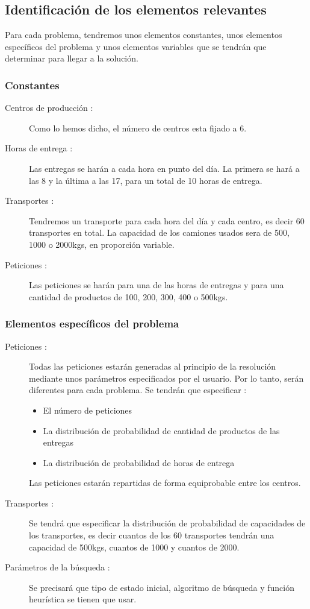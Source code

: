 \documentclass{article}
\begin{document}
\subsection{Identificación de los elementos relevantes}
Para cada problema, tendremos unos elementos constantes, unos elementos
específicos del problema y unos elementos variables que se tendrán que
determinar para llegar a la solución.

\subsubsection{Constantes}
\begin{description}
\item[Centros de producción :] Como lo hemos dicho, el número de centros esta 
fijado a 6.
\item[Horas de entrega :] Las entregas se harán a cada hora en punto del día. La
primera se hará a las 8 y la última a las 17, para un total de 10 horas de
entrega.
\item[Transportes :] Tendremos un transporte para cada hora del día y cada
centro, es decir 60 transportes en total. La capacidad de los camiones usados
sera de 500, 1000 o 2000kgs, en proporción variable.
\item[Peticiones :] Las peticiones se harán para una de las horas de entregas y
para una cantidad de productos de 100, 200, 300, 400 o 500kgs.
\end{description}

\subsubsection{Elementos específicos del problema}
\begin{description}
\item[Peticiones :] Todas las peticiones estarán generadas al principio de la
resolución mediante unos parámetros especificados por el usuario. Por lo tanto,
serán diferentes para cada problema. Se tendrán que especificar :
\begin{itemize}
\item El número de peticiones
\item La distribución de probabilidad de cantidad de productos de las entregas
\item La distribución de probabilidad de horas de entrega
\end{itemize}
Las peticiones estarán repartidas de forma equiprobable entre los centros.
\item[Transportes :] Se tendrá que especificar la distribución de probabilidad
de capacidades de los transportes, es decir cuantos de los 60 transportes
tendrán una capacidad de 500kgs, cuantos de 1000 y cuantos de 2000.
\item[Parámetros de la búsqueda :] Se precisará que tipo de estado inicial,
algoritmo de búsqueda y función heurística se tienen que usar. 
\end{description}
\end{document}
